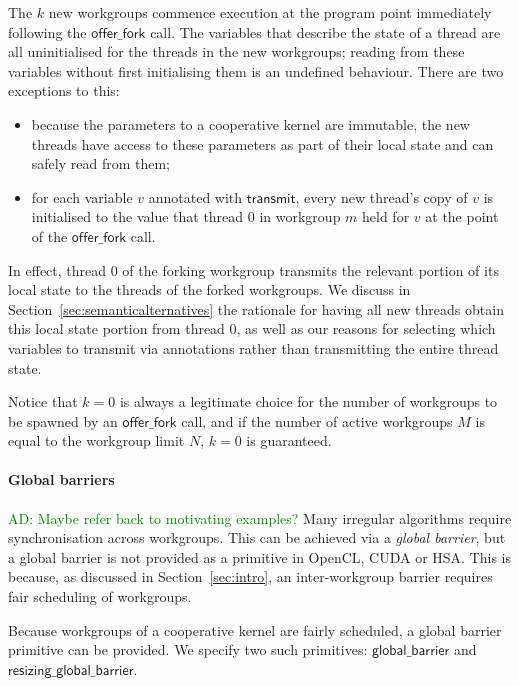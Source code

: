 \documentclass[nocopyrightspace]{sigplanconf-pldi16}
\newcommand{\ADComment}[1]{\textcolor{green}{AD: #1}}
\newcommand{\transmit}{\mathsf{transmit}}
\newcommand{\offerfork}{\mathsf{offer\_fork}}
\newcommand{\globalbarrier}{\mathsf{global\_barrier}}
\newcommand{\resizingglobalbarrier}{\mathsf{resizing\_global\_barrier}}
\begin{document}
The $k$ new workgroups commence execution at the program point
immediately following the $\offerfork$ call.  The variables that
describe the state of a thread are all uninitialised for the threads
in the new workgroups; reading from these variables without first
initialising them is an undefined behaviour.  There are two exceptions
to this:

\begin{itemize}

\item because the parameters to a cooperative kernel are immutable,
  the new threads have access to these parameters as part of their
  local state and can safely read from them;

\item for each variable $v$ annotated with $\transmit$, every new
  thread's copy of $v$ is initialised to the value that thread 0 in
  workgroup $m$ held for $v$ at the point of the $\offerfork$ call.

\end{itemize}

In effect, thread 0 of the forking workgroup transmits the relevant
portion of its local state to the threads of the forked workgroups.
We discuss in Section~\ref{sec:semanticalternatives} the rationale for
having all new threads obtain this local state portion from thread 0,
as well as our reasons for selecting which variables to transmit via
annotations rather than transmitting the entire thread state.

Notice that $k=0$ is always a legitimate choice for the number of
workgroups to be spawned by an $\offerfork$ call, and if the number of
active workgroups $M$ is equal to the workgroup limit $N$, $k=0$ is
guaranteed.

\paragraph{Global barriers}

\ADComment{Maybe refer back to motivating examples?}
Many irregular algorithms require synchronisation across workgroups.
This can be achieved via a \emph{global barrier}, but a global barrier
is not provided as a primitive in OpenCL, CUDA or HSA.  This is
because, as discussed in Section~\ref{sec:intro}, an inter-workgroup barrier
requires fair scheduling of workgroups.

Because workgroups of a cooperative kernel are fairly scheduled, a
global barrier primitive can be provided.  We specify two such primitives: $\globalbarrier$
and $\resizingglobalbarrier$.
\end{document}

